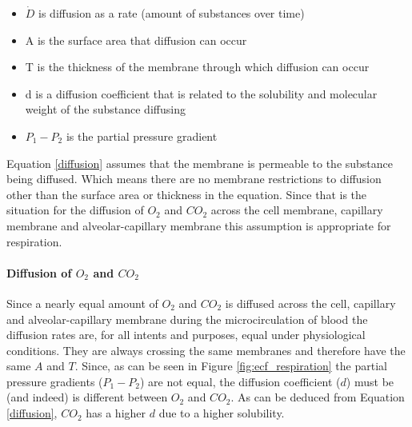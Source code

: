 \begin{itemize}
    \item $\dot{D}$ is diffusion as a rate (amount of substances over time)
    \item A is the surface area that diffusion can occur
    \item T is the thickness of the membrane through which diffusion can occur
    \item d is a diffusion coefficient that is related to the solubility and molecular weight of the substance diffusing
    \item $P_1 - P_2$ is the partial pressure gradient
\end{itemize}

Equation \ref{diffusion} assumes that the membrane is permeable to the substance being diffused. Which means there are no membrane restrictions to diffusion other than the surface area or thickness in the equation. Since that is the situation for the diffusion of $O_2$ and $CO_2$ across the cell membrane, capillary membrane and alveolar-capillary membrane this assumption is appropriate for respiration.

\paragraph{Diffusion of $O_2$ and $CO_2$}

Since a nearly equal amount of $O_2$ and $CO_2$ is diffused across the cell, capillary and alveolar-capillary membrane during the microcirculation of blood the diffusion rates are, for all intents and purposes, equal under physiological conditions. They are always crossing the same membranes and therefore have the same $A$ and $T$. Since, as can be seen in Figure \ref{fig:ecf_respiration} the partial pressure gradients ($P_1 - P_2$) are not equal, the diffusion coefficient ($d$) must be (and indeed) is different between $O_2$ and $CO_2$. As can be deduced from Equation \ref{diffusion}, $CO_2$ has a higher $d$ due to a higher solubility.\footnotemark{}



